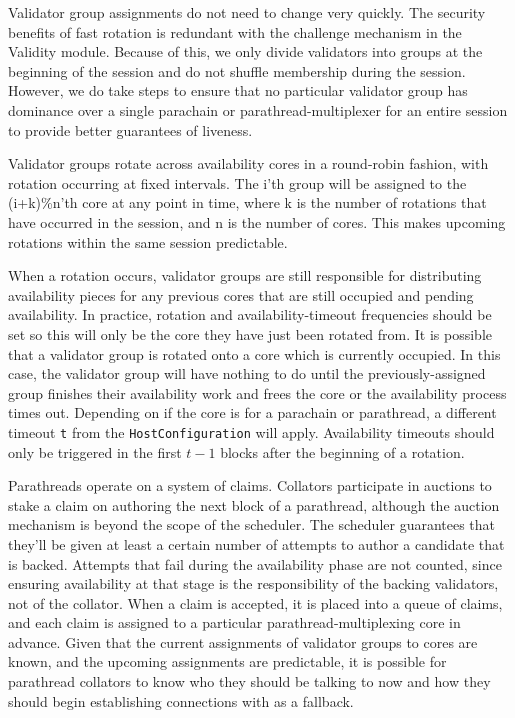 Validator group assignments do not need to change very quickly. The security
benefits of fast rotation is redundant with the challenge mechanism in the
Validity module. Because of this, we only divide validators into groups at the
beginning of the session and do not shuffle membership during the session.
However, we do take steps to ensure that no particular validator group has
dominance over a single parachain or parathread-multiplexer for an entire
session to provide better guarantees of liveness.
\newline

Validator groups rotate across availability cores in a round-robin fashion, with
rotation occurring at fixed intervals. The i'th group will be assigned to the
(i+k)\%n'th core at any point in time, where k is the number of rotations that
have occurred in the session, and n is the number of cores. This makes upcoming
rotations within the same session predictable.
\newline

When a rotation occurs, validator groups are still responsible for distributing
availability pieces for any previous cores that are still occupied and pending
availability. In practice, rotation and availability-timeout frequencies should
be set so this will only be the core they have just been rotated from. It is
possible that a validator group is rotated onto a core which is currently
occupied. In this case, the validator group will have nothing to do until the
previously-assigned group finishes their availability work and frees the core or
the availability process times out. Depending on if the core is for a parachain
or parathread, a different timeout \verb|t| from the \verb|HostConfiguration| will apply.
Availability timeouts should only be triggered in the first $t-1$ blocks after the
beginning of a rotation.
\newline

Parathreads operate on a system of claims. Collators participate in auctions to
stake a claim on authoring the next block of a parathread, although the auction
mechanism is beyond the scope of the scheduler. The scheduler guarantees that
they'll be given at least a certain number of attempts to author a candidate
that is backed. Attempts that fail during the availability phase are not
counted, since ensuring availability at that stage is the responsibility of the
backing validators, not of the collator. When a claim is accepted, it is placed
into a queue of claims, and each claim is assigned to a particular
parathread-multiplexing core in advance. Given that the current assignments of
validator groups to cores are known, and the upcoming assignments are
predictable, it is possible for parathread collators to know who they should be
talking to now and how they should begin establishing connections with as a
fallback.
\newline

